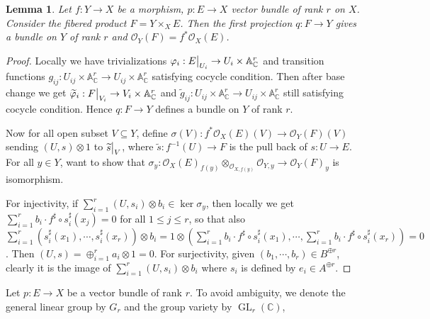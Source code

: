 \documentclass{ctexart}
\newtheorem{lemma}{Lemma}[section]
\newcommand{\generallineargroup}[2]{\operatorname{GL}_{#1}(#2)}
\begin{document}
\begin{lemma}
    Let $f: Y \rightarrow X$ be a morphism, $p: E \rightarrow X$ vector bundle of rank $r$ on $X$.
    Consider the fibered product $F = Y \times_{X} E$.
    Then the first projection $q: F \rightarrow Y$ gives a bundle on $Y$ of rank $r$ and $\mathcal{O}_{Y}(F) = f^{\ast}\mathcal{O}_{X}(E)$.
    \label{Lemma 1.7}
\end{lemma}
\begin{proof}
    Locally we have trivializations $\varphi_{i}: E\big{|}_{U_{i}} \rightarrow U_{i} \times \mathbb{A}_{\mathbb{{C}}}^{r}$ and transition functions $g_{ij}: U_{ij} \times \mathbb{A}_{\mathbb{{C}}}^{r} \rightarrow U_{ij} \times \mathbb{A}_{\mathbb{{C}}}^{r}$ satisfying cocycle condition.
    Then after base change we get $\widetilde{\varphi}_{i}: F\big{|}_{V_{i}} \rightarrow V_{i} \times \mathbb{A}_{\mathbb{{C}}}^{r}$ and $\widetilde{g}_{ij}: U_{ij} \times \mathbb{A}_{\mathbb{{C}}}^{r} \rightarrow U_{ij} \times \mathbb{A}_{\mathbb{{C}}}^{r}$ still satisfying cocycle condition.
    Hence $q: F \rightarrow Y$ defines a bundle on $Y$ of rank $r$.
    \par
    Now for all open subset $V \subseteq Y$, define $\sigma(V): f^{\ast}\mathcal{O}_{X}(E)(V) \rightarrow \mathcal{O}_{Y}(F)(V)$ sending $(U, s) \otimes 1$ to $\widetilde{s}\big{|}_{V}$,
    where $\widetilde{s}: f^{-1}(U) \rightarrow F$ is the pull back of $s: U \rightarrow E$.
    For all $y\in Y$, want to show that $\sigma_{y}: \mathcal{O}_{X}(E)_{f(y)} \otimes_{\mathcal{O}_{X, f(y)}} \mathcal{O}_{Y, y} \rightarrow \mathcal{O}_{Y}(F)_{y}$ is isomorphism.
    \par
    For injectivity, if $\sum_{i = 1}^{r} (U, s_{i}) \otimes b_{i}\in \ker \sigma_{y}$,
    then locally we get $\sum_{i = 1}^{r} b_{i} \cdot f^{\sharp} \circ s_{i}^{\sharp}(x_{j}) = 0$ for all $1 \le j \le r$,
    so that also $\sum_{i = 1}^{r} (s_{i}^{\sharp}(x_{1}), \cdots, s_{i}^{\sharp}(x_{r})) \otimes b_{i} = 1 \otimes (\sum_{i = 1}^{r} b_{i} \cdot f^{\sharp} \circ s_{i}^{\sharp}(x_{1}), \cdots, \sum_{i = 1}^{r} b_{i} \cdot f^{\sharp} \circ s_{i}^{\sharp}(x_{r})) = 0$.
    Then $(U, s) = \oplus_{i = 1}^{r} a_{i} \otimes 1 = 0$.
    For surjectivity, given $(b_{1}, \cdots, b_{r})\in B^{\oplus r}$,
    clearly it is the image of $\sum_{i = 1}^{r} (U, s_{i}) \otimes b_{i}$ where $s_{i}$ is defined by $e_{i}\in A^{\oplus r}$.
\end{proof}
Let $p: E \rightarrow X$ be a vector bundle of rank $r$.
To avoid ambiguity, we denote the general linear group by $G_{r}$ and the group variety by $\generallineargroup{r}{\mathbb{C}}$,
\end{document}
